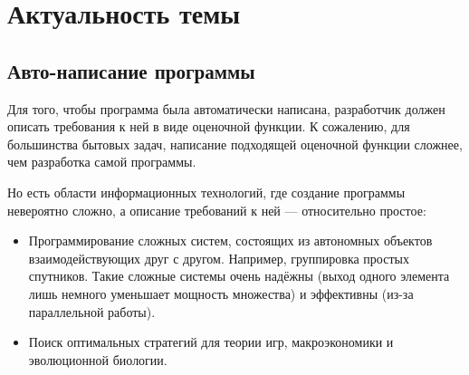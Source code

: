 \documentclass[utf8,a5paper,portrait,10pt,twoside]{eskdtext}
\begin{document}
\renewcommand{\ESKDapprovingName}{Работа допущена к защите}

\renewcommand{\ESKDtheTitleFieldVIII}{
\begin{flushleft}
Направление: 230100 — Информатика и вычислительная техника.\\
Специальность: 230105 — Программное обеспечение вычислительной техники
и автоматизированных систем.

\vspace{10mm}
Исполнитель: \hfill Ситник Андрей Андреевич \\
Научный руководитель: \hfill  Амосов Владимир Владимирович \\
Рецензент: \hfill \\
\end{flushleft}}

\renewcommand{\ESKDtheTitleFieldX}{Санкт-Петербург 2001}

\maketitle

\tableofcontents

\newpage
\section{Актуальность темы}

\subsection{Авто-написание программы}

Для того, чтобы программа была автоматически написана, разработчик должен
описать требования к ней в виде оценочной функции. К сожалению, для большинства
бытовых задач, написание подходящей оценочной функции сложнее, чем
разработка самой программы.

Но есть области информационных технологий, где создание программы невероятно
сложно, а описание требований к ней — относительно простое:
\begin{itemize}
  \item Программирование сложных систем, состоящих из автономных объектов
        взаимодействующих друг с другом. Например, группировка простых
        спутников. Такие сложные системы очень надёжны (выход одного элемента
        лишь немного уменьшает мощность множества) и эффективны (из-за
        параллельной работы).
  \item Поиск оптимальных стратегий для теории игр, макроэкономики и
        эволюционной биологии.\cite{communication}
\end{itemize}
\end{document}
